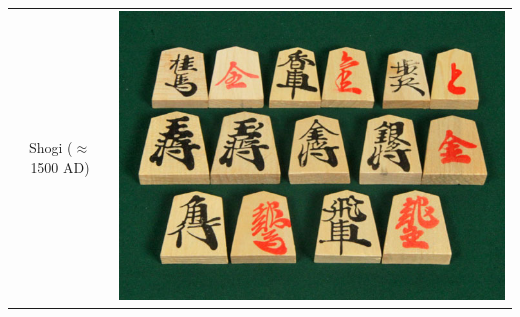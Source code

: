 \documentclass{beamer}
\begin{document}
\begin{frame}
\begin{tabular}{cc}
Shogi ($\approx$1500 AD) & \includegraphics[scale = 0.15]{shogi.jpg}
\end{tabular}
\end{frame}
\end{document}
